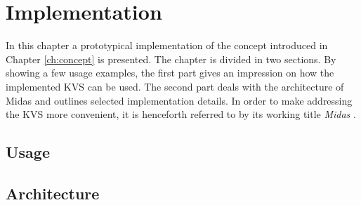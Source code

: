 \chapter{Implementation}
\label{ch:impl}

In this chapter a prototypical implementation of the concept introduced in
Chapter \ref{ch:concept} is presented. The chapter is divided in two sections.
By showing a few usage examples, the first part gives an impression on how the
implemented KVS can be used. The second part deals with the architecture of
Midas and outlines selected implementation details. In order to make addressing
the KVS more convenient, it is henceforth referred to by its working title
\emph{Midas} \footnotemark.


\section{Usage}
\label{ch:impl-usage}


\clearpage

\section{Architecture}
\label{ch:impl-arch}

